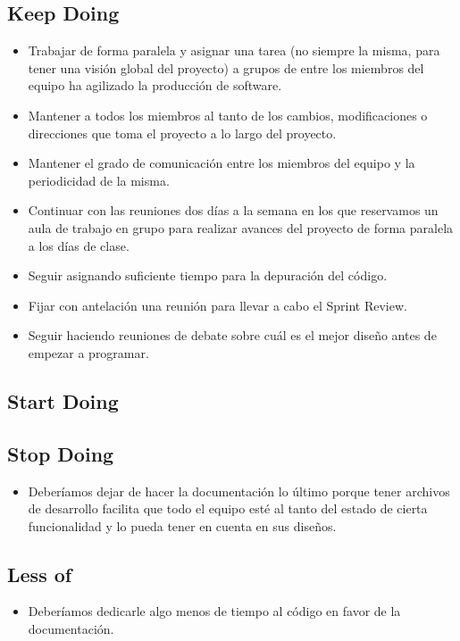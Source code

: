 \documentclass{article}
\begin{document}
\subsection{Keep Doing}
\begin{itemize}
\item Trabajar de forma paralela y asignar una tarea (no siempre la misma, para tener una visión global del proyecto) a grupos de entre los miembros del equipo ha agilizado la producción de software.

\item Mantener a todos los miembros al tanto de los cambios, modificaciones o direcciones que toma el proyecto a lo largo del proyecto.

\item Mantener el grado de comunicación entre los miembros del equipo y la periodicidad de la misma.

\item Continuar con las reuniones dos días a la semana en los que reservamos un aula de trabajo en grupo para realizar avances del proyecto de forma paralela a los días de clase.

\item Seguir asignando suficiente tiempo para la depuración del código.

\item Fijar con antelación una reunión para llevar a cabo el Sprint Review.

\item Seguir haciendo reuniones de debate sobre cuál es el mejor diseño antes de empezar a programar.
\end{itemize}

\subsection{Start Doing}

\subsection{Stop Doing}
\begin{itemize}
\item Deberíamos dejar de hacer la documentación lo último porque tener archivos de desarrollo facilita que todo el equipo esté al tanto del estado de cierta funcionalidad y lo pueda tener en cuenta en sus diseños.
\end{itemize}

\subsection{Less of}
\begin{itemize}
\item Deberíamos dedicarle algo menos de tiempo al código en favor de la documentación.
\end{itemize}
\end{document}
